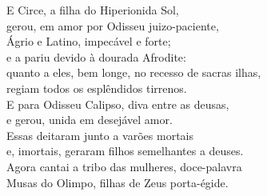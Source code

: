 \begin{pages}
\begin{Rightside}
\quad{}E Circe, a filha do Hiperionida Sol,\\
gerou, em amor por Odisseu juizo-paciente,\\
Ágrio e Latino, impecável e forte;\\
e a  pariu devido à dourada Afrodite:\\
quanto a eles, bem longe, no recesso de sacras ilhas, \\
regiam todos os esplêndidos tirrenos.\\

\quad{}E  para Odisseu Calipso, diva entre as deusas,\\
e  gerou, unida em desejável amor.\\

\quad{}Essas deitaram junto a varões mortais\\
e, imortais, geraram filhos semelhantes a deuses. \\
Agora cantai a tribo das mulheres, doce-palavra\\
Musas do Olimpo, filhas de Zeus porta-égide.            
            \pend
         \endnumbering
    \end{Rightside}
\end{pages}
\Pages